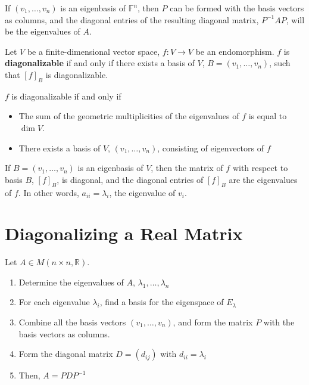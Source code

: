 \documentclass[letterpaper,12pt]{article}
\begin{document}
\begin{corollary}
If $(v_1, \dots, v_n)$ is an eigenbasis of $\mathbb{F}^n$, then $P$ can be formed with the basis vectors as columns, and the diagonal entries of the resulting diagonal matrix, $P^{-1}AP$, will be the eigenvalues of $A$.
\end{corollary}

\begin{definition}
Let $V$ be a finite-dimensional vector space, $f: V \rightarrow V$ be an endomorphism. $f$ is \textbf{diagonalizable} if and only if there exists a basis of $V$, $B = (v_1, \dots, v_n)$, such that $[f]_{B}$ is diagonalizable.
\end{definition}

\begin{corollary}
$f$ is diagonalizable if and only if
\begin{itemize}
    \item The sum of the geometric multiplicities of the eigenvalues of $f$ is equal to $\dim{V}$.
    \item There exists a basis of $V$, $(v_1, \dots, v_n)$, consisting of eigenvectors of $f$
\end{itemize}
\end{corollary}

\begin{corollary}
If $B = (v_1, \dots, v_n)$ is an eigenbasis of $V$, then the matrix of $f$ with respect to basis $B$, $[f]_{B}$, is diagonal, and the diagonal entries of $[f]_{B}$ are the eigenvalues of $f$. In other words, $a_{ii} = \lambda_i$, the eigenvalue of $v_i$.
\end{corollary}

\section*{Diagonalizing a Real Matrix}
Let $A \in M(n \times n, \mathbb{R})$.
\begin{enumerate}
    \item Determine the eigenvalues of $A$, $\lambda_1, \dots, \lambda_n$
    \item For each eigenvalue $\lambda_i$, find a basis for the eigenspace of $E_{\lambda}$
    \item Combine all the basis vectors $(v_1, \dots, v_n)$, and form the matrix $P$ with the basis vectors as columns.
    \item Form the diagonal matrix $D = (d_{ij})$ with $d_{ii} = \lambda_i$
    \item Then, $A = PDP^{-1}$
\end{enumerate}
\end{document}
